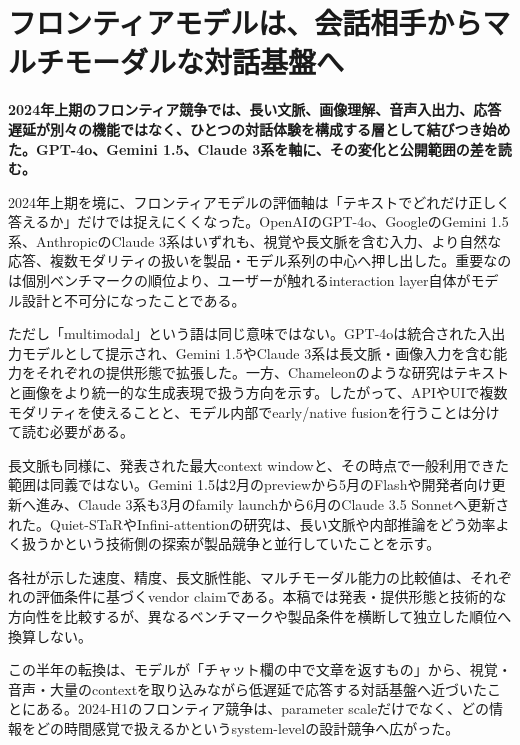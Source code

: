 \section{フロンティアモデルは、会話相手からマルチモーダルな対話基盤へ}
\label{pkg:frontier-interaction}
\noindent\textbf{2024年上期のフロンティア競争では、長い文脈、画像理解、音声入出力、応答遅延が別々の機能ではなく、ひとつの対話体験を構成する層として結びつき始めた。GPT-4o、Gemini 1.5、Claude 3系を軸に、その変化と公開範囲の差を読む。}\autocite{src-28ee6f0f00f4,src-2d3a533e91db,src-e91e6f80eaac}

2024年上期を境に、フロンティアモデルの評価軸は「テキストでどれだけ正しく答えるか」だけでは捉えにくくなった。OpenAIのGPT-4o、GoogleのGemini 1.5系、AnthropicのClaude 3系はいずれも、視覚や長文脈を含む入力、より自然な応答、複数モダリティの扱いを製品・モデル系列の中心へ押し出した。重要なのは個別ベンチマークの順位より、ユーザーが触れるinteraction layer自体がモデル設計と不可分になったことである。\autocite{src-28ee6f0f00f4,src-2d3a533e91db,src-e91e6f80eaac}


ただし「multimodal」という語は同じ意味ではない。GPT-4oは統合された入出力モデルとして提示され、Gemini 1.5やClaude 3系は長文脈・画像入力を含む能力をそれぞれの提供形態で拡張した。一方、Chameleonのような研究はテキストと画像をより統一的な生成表現で扱う方向を示す。したがって、APIやUIで複数モダリティを使えることと、モデル内部でearly/native fusionを行うことは分けて読む必要がある。\autocite{src-28ee6f0f00f4,src-2d3a533e91db,src-e1259b3c0804,src-e91e6f80eaac}


長文脈も同様に、発表された最大context windowと、その時点で一般利用できた範囲は同義ではない。Gemini 1.5は2月のpreviewから5月のFlashや開発者向け更新へ進み、Claude 3系も3月のfamily launchから6月のClaude 3.5 Sonnetへ更新された。Quiet-STaRやInfini-attentionの研究は、長い文脈や内部推論をどう効率よく扱うかという技術側の探索が製品競争と並行していたことを示す。\autocite{src-12fa04e64d24,src-28ee6f0f00f4,src-2eb2353f0533,src-e91e6f80eaac}


\begin{claimboundary}
各社が示した速度、精度、長文脈性能、マルチモーダル能力の比較値は、それぞれの評価条件に基づくvendor claimである。本稿では発表・提供形態と技術的な方向性を比較するが、異なるベンチマークや製品条件を横断して独立した順位へ換算しない。\autocite{src-06ed597872be,src-28ee6f0f00f4,src-2d3a533e91db,src-a2cf0d0271ac,src-e91e6f80eaac}
\end{claimboundary}

この半年の転換は、モデルが「チャット欄の中で文章を返すもの」から、視覚・音声・大量のcontextを取り込みながら低遅延で応答する対話基盤へ近づいたことにある。2024-H1のフロンティア競争は、parameter scaleだけでなく、どの情報をどの時間感覚で扱えるかというsystem-levelの設計競争へ広がった。\autocite{src-28ee6f0f00f4,src-2d3a533e91db,src-e1259b3c0804,src-e91e6f80eaac}
